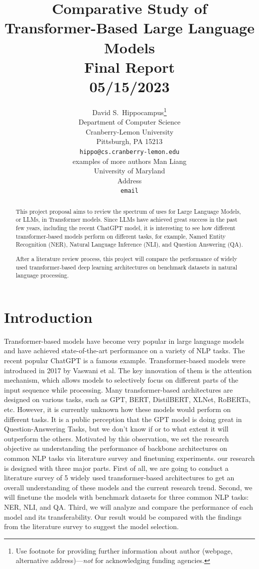 \documentclass{article}
\title{Comparative Study of Transformer-Based Large Language Models\\Final Report \\05/15/2023}
\author{
  David S.~Hippocampus\thanks{Use footnote for providing further information
    about author (webpage, alternative address)---\emph{not} for acknowledging
    funding agencies.} \\
  Department of Computer Science\\
  Cranberry-Lemon University\\
  Pittsburgh, PA 15213 \\
  \texttt{hippo@cs.cranberry-lemon.edu} \\
  examples of more authors
  \And
  Man Liang \\
  University of Maryland \\
  Address \\
  \texttt{email} \\
}
\begin{document}
\maketitle

\begin{abstract}
 This project proposal aims to review the spectrum of uses for Large Language Models, or LLMs, in Transformer models. Since LLMs have achieved great success in the past few years, including the recent ChatGPT model, it is interesting to see how different transformer-based models perform on different tasks, for example, Named Entity Recognition (NER), Natural Language Inference (NLI), and Question Answering (QA). 

 After a literature review process, this project will compare the performance of widely used transformer-based deep learning architectures on benchmark datasets in natural language processing. 
\end{abstract}


\section{Introduction}
Transformer-based models have become very popular in large language models and have achieved state-of-the-art performance on a variety of NLP tasks. The recent popular ChatGPT is a famous example. Transformer-based models were introduced in 2017 by Vaswani et al. The key innovation of them is the attention mechanism, which allows models to selectively focus on different parts of the input sequence while processing. Many transformer-based architectures are designed on various tasks, such as GPT, BERT, DistilBERT, XLNet, RoBERTa, etc. However, it is currently unknown how these models would perform on different tasks. It is a public perception that the GPT model is doing great in Question-Answering Tasks, but we don't know if or to what extent it will outperform the others. Motivated by this observation, we 
 set the research objective as understanding the performance of backbone architectures on common NLP tasks via literature survey and finetuning experiments. our research is designed with three major parts. First of all, we are going to conduct a literature survey of 5 widely used transformer-based architectures to get an overall understanding of these models and the current research trend. Second, we will finetune the models with benchmark datasets for three common NLP tasks: NER, NLI, and QA. Third, we will analyze and compare the performance of each model and its transferability. Our result would be compared with the findings from the literature survey to suggest the model selection. 
\end{document}

